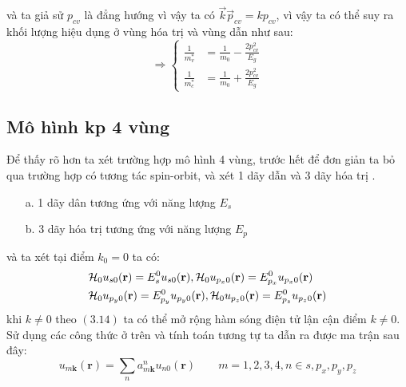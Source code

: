 và ta giả sử $p_{cv}$ là đẳng hướng vì vậy ta có $\vec{k}\vec{p}_{cv}=kp_{cv}$, vì vậy ta có thể suy ra khối lượng hiệu dụng ở vùng hóa trị và vùng dẫn như sau:
\begin{equation}
\Longrightarrow\left\{
\begin{array}{cc}
\frac{1}{m_v^*}&=\frac{1}{m_0}-\frac{2p_{cv}^2}{E_g}\\
\frac{1}{m_c^*}&=\frac{1}{m_0}+\frac{2p_{cv}^2}{E_g}
\end{array} \right.
\end{equation}
 
 \subsection{Mô hình kp 4 vùng}
Để thấy rõ hơn ta xét trường hợp mô hình 4 vùng, trước hết để đơn giản ta bỏ qua trường hợp có tương tác spin-orbit, và xét 1 dãy dẫn và 3 dãy hóa trị .
 \begin{itemize}
 \item [a.] 1 dãy dân tương ứng với năng lượng $E_s$ 
 \item [b.] 3 dãy hóa trị tương ứng với năng lượng $E_p$
 \end{itemize}
 và ta xét tại điểm $k_0=0$ ta có:
 \begin{align}
 &\mathcal{H}_0u_{s0}(\mathbf{r}) = E_s^0u_{s0}(\mathbf{r}),
 \mathcal{H}_0u_{p_x0}(\mathbf{r}) = E_{p_x}^0u_{p_x0}(\mathbf{r}) \notag  \\
 &\mathcal{H}_0u_{p_y0}(\mathbf{r}) = E_{p_y}^0u_{p_y0}(\mathbf{r}),
 \mathcal{H}_0u_{p_z0}(\mathbf{r}) = E_{p_z}^0u_{p_z0}(\mathbf{r})
\end{align}  
khi $k\neq 0$ theo $(3.14)$ ta có thể mở rộng hàm sóng điện tử lận cận điểm $k \neq 0$. Sử dụng các công thức ở trên và tính toán tương tự ta dẫn ra được ma trận sau đây:
\begin{equation}
u_{m\mathbf{k}}(\mathbf{r})=\sum_n a_{m\mathbf{k}}^n u_{n0}(\mathbf{r}) \qquad m=1,2,3,4,n \in {s,p_x,p_y,p_z}
\end{equation} 

